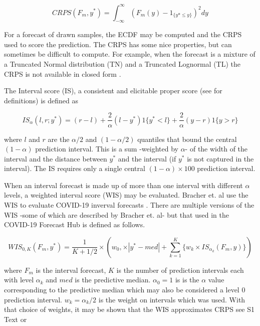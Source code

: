 \documentclass{article}\usepackage[]{graphicx}\usepackage[]{color}
\begin{document}
\begin{equation}
  CRPS(F_m, y^*) = \int_{-\infty}^{\infty} (F_m(y) - 1_{\{y*\leq y\}})^2 dy
\end{equation}

For a forecast of drawn samples, the ECDF may be computed and the CRPS used to 
score the prediction. The CRPS has some nice properties, but can sometimes be
difficult to compute. For example, when the forecast is a mixture of a 
Truncated Normal distribution (TN) and a Truncated Lognormal (TL) the CRPS is 
not available in closed form \cite{baran2018combining}.

The Interval score (IS), a consistent and elicitable proper score 
(see \cite{gneiting2014probabilistic} for definitions) is defined as 

\begin{equation}
  IS_{\alpha}(l,r; y^*) = (r-l) + \frac{2}{\alpha}(l-y^*)1\{y^*<l\} 
  + \frac{2}{\alpha}(y-r)1\{y>r\}
\end{equation}

where $l$ and $r$ are the $\alpha/2$ and $(1-\alpha/2)$ quantiles that bound
the central $(1-\alpha)$ prediction interval. This is a sum -weighted by 
$\alpha$- of the width of the
interval and the distance between $y^*$ and the interval (if $y^*$ is not 
captured in the interval). The IS requires only a single central 
$(1-\alpha) \times 100$ prediction interval.

When an interval forecast is made up of more than one interval with different
$\alpha$ levels, a weighted interval score (WIS) may be evaluated. Bracher et.
al use the WIS to evaluate COVID-19 inverval forecasts 
\cite{bracher2021evaluating}. There are multiple versions of the WIS -some of 
which are described by Bracher et. al- but that used in the COVID-19 Forecast
Hub is defined as follows.

\begin{equation}
  WIS_{0,K}(F_m,y^*) = \frac{1}{K + 1/2} \times (w_0, \times |y^*-med|+
  \sum_{k=1}^K \{ w_k \times IS_{\alpha_k}(F_m,y) \} )
\end{equation}

where $F_m$ is the interval forecast, $K$ is the number of prediction intervals
each with level $\alpha_k$ and $med$ is the predictive median. $\alpha_0 = 1$ is 
is the $\alpha$ value corresponding to the predictive median which may also be
considered a level 0 prediction interval. $w_k = \alpha_k/2$ is the weight on
intervals which was used. With that choice of weights, it may be shown that the
WIS approximates CRPS see S1 Text  \cite{bracher2021evaluating} or
\end{document}
